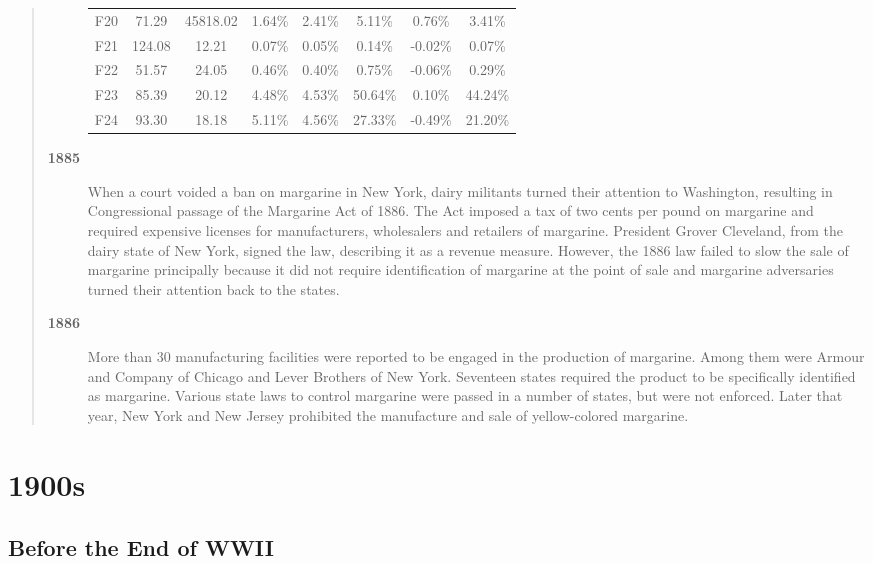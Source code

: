 \documentclass[opre,nonblindrev]{informs3} %
\begin{document}
\begin{quotation}
\begin{description}
\begin{table}[!ht]
{\begin{tabular}{|c|ccccccc|}
      F20 & 71.29 & 45818.02 & 1.64\% & 2.41\% & 5.11\% & 0.76\% & 3.41\% \\ 
      F21 & 124.08 & 12.21 & 0.07\% & 0.05\% & 0.14\% & -0.02\% & 0.07\% \\ 
      F22 & 51.57 & 24.05 & 0.46\% & 0.40\% & 0.75\% & -0.06\% & 0.29\% \\ 
      F23 & 85.39 & 20.12 & 4.48\% & 4.53\% & 50.64\% & 0.10\% & 44.24\% \\ 
      F24 & 93.30  & 18.18 & 5.11\% & 4.56\% & 27.33\% & -0.49\% & 21.20\% \\ \hline
  \end{tabular}
  }
\end{table}

\item[\bf 1885] When a court voided a ban on margarine in New York,
dairy militants turned their attention to Washington, resulting in
Congressional passage of the Margarine Act of 1886. The Act imposed
a tax of two cents per pound on margarine and required expensive
licenses for manufacturers, wholesalers and retailers of margarine.
President Grover Cleveland, from the dairy state of New York, signed
the law, describing it as a revenue measure. However, the 1886 law
failed to slow the sale of margarine principally because it did not
require identification of margarine at the point of sale and
margarine adversaries turned their attention back to the states.

\item[\bf 1886] More than 30 manufacturing facilities were reported to
be engaged in the production of margarine. Among them were Armour
and Company of Chicago and Lever Brothers of New York. Seventeen
states required the product to be specifically identified as
margarine. Various state laws to control margarine were passed in a
number of states, but were not enforced. Later that year, New York
and New Jersey prohibited the manufacture and sale of yellow-colored
margarine.

\end{description}

\end{quotation}



\section{1900s}

\subsection{Before the End of WWII}
\end{document}
